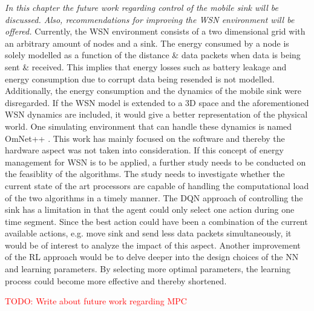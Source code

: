 \textit{In this chapter the future work regarding control of the mobile sink will be discussed. Also, recommendations for improving the WSN environment will be offered. \newline}
\newline
\noindent Currently, the WSN environment consists of a two dimensional grid with an arbitrary amount of nodes and a sink. The energy consumed by a node is solely modelled as a function of the distance \& data packets when data is being sent \& received. This implies that energy losses such as battery leakage and energy consumption due to corrupt data being resended is not modelled. Additionally, the energy consumption and the dynamics of the mobile sink were disregarded. If the WSN model is extended to a 3D space and the aforementioned WSN dynamics are included, it would give a better representation of the physical world. One simulating environment that can handle these dynamics is named OmNet++ \cite{varga2008overview}. \newline
\newline
\noindent This work has mainly focused on the software and thereby the hardware aspect was not taken into consideration. If this concept of energy management for WSN is to be applied, a further study needs to be conducted on the feasiblity of the algorithms. The study needs to investigate whether the current state of the art processors are capable of handling the computational load of the two algorithms in a timely manner. \newline
\newline
\noindent The DQN approach of controlling the sink has a limitation in that the agent could only select one action during one time segment. Since the best action could have been a combination of the current available actions, e.g. move sink and send less data packets simultaneously, it would be of interest to analyze the impact of this aspect. Another improvement of the RL approach would be to delve deeper into the design choices of the NN and learning parameters. By selecting more optimal parameters, the learning process could become more effective and thereby shortened. \newline

\textcolor{red}{TODO: Write about future work regarding MPC} \newline


